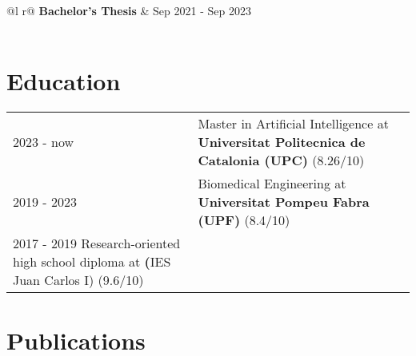 \documentclass[a4paper,12pt]{article}
\begin{document}
\begin{tabularx}{\linewidth}{ @{}l r@{} }
\textbf{Bachelor's Thesis} & \hfill Sep 2021 - Sep 2023 \\[3.75pt]
  \\
\end{tabularx}

\section{Education}
\begin{tabularx}{\linewidth}{@{}l X@{}}	
2023 - now & Master in Artificial Intelligence at \textbf{Universitat Politecnica de Catalonia (UPC)} \hfill \normalsize (8.26/10) \\
2019 - 2023 & Biomedical Engineering at \textbf{Universitat Pompeu Fabra (UPF)} \hfill (8.4/10) \\ 
2017 - 2019 Research-oriented high school diploma at \textbf(IES Juan Carlos I) \hfill (9.6/10) \\
\end{tabularx}

\section{Publications}
\begin{refsection}
\nocite{UTI2024}
\nocite{honey2023}
\nocite{wine2022}
\printbibliography[heading=none]
\end{refsection}

\vfill
{}
\end{document}
